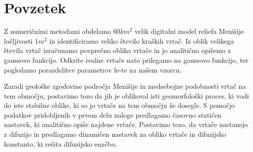 \documentclass[a4paper, oneside, 12pt]{book}
\newcommand{\clearemptydoublepage}{\newpage{\pagestyle{empty}\cleardoublepage}}
\begin{document}
      \clearemptydoublepage

        \def\thepage{}%
        \tableofcontents{}

        \clearemptydoublepage

        \chapter*{Povzetek}

        Z numeričnimi metodami obdelamo $60 km^2$ velik digitalni model reliefa Menišije ločljivosti $1m^2$ in identificiramo veliko število kraških vrtač. Iz oblik velikega števila vrtač izračunamo povprečno obliko vrtače in jo analitično opišemo z gaussovo funkcijo. Odkrite realne vrtače nato prilegamo na gaussovo funkcijo, ter pogledamo porazdelitev parametrov le-te na našem vzorcu.

        Zaradi geološke zgodovine področja Menišije in medsebojne podobnosti vrtač na tem območju, postavimo tezo da jih je oblikoval isti geomorfološki proces, ki vodi do iste stabilne oblike, ki so jo vrtače na tem območju že dosegle.
        S pomočjo podatkov pridobljenih v prvem delu naloge predlagamo časovno statičen nastavek, ki analitično opiše najdene vrtače. Postavimo tezo, da vrtače nastanejo z difuzijo in predlagamo dinamičen nastavek za obliko vrtače in difuzijsko konstanto, ki rešita difuzijsko enačbo.
\end{document}
